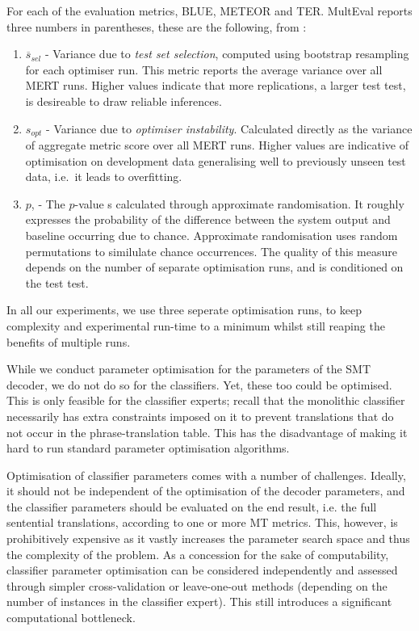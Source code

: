 For each of the evaluation metrics, BLUE, METEOR and TER. MultEval reports
three numbers in parentheses, these are the following, from \cite{MERTCONTROL}:

\begin{enumerate}
\item $\overline{s}_{sel}$ - Variance due to \emph{test set selection},
computed using bootstrap resampling for each optimiser run. This metric reports
the average variance over all MERT runs. Higher values indicate that more
replications, a larger test test, is desireable to draw reliable inferences.
\item $s_{opt}$ - Variance due to \emph{optimiser instability}. Calculated
directly as the variance of aggregate metric score over all MERT runs. Higher
values are indicative of optimisation on development data generalising well to
previously unseen test data, i.e.\ it leads to overfitting. 
\item $p$, - The $p$-value s calculated through approximate randomisation. It roughly
expresses the probability of the difference between the system output and
baseline occurring due to chance. Approximate randomisation uses random
permutations to similulate chance occurrences. The quality of this measure depends on the number of separate
optimisation runs, and is conditioned on the test test. 
\end{enumerate}

In all our experiments, we use three seperate optimisation runs, to keep
complexity and experimental run-time to a minimum whilst still reaping the
benefits of multiple runs.

While we conduct parameter optimisation for the parameters of the SMT
decoder, we do not do so for the classifiers. Yet, these too could
be optimised. This is only feasible for the classifier experts; recall
that the monolithic classifier necessarily has extra constraints
imposed on it to prevent translations that do not occur in the
phrase-translation table. This has the disadvantage of making it hard
to run standard parameter optimisation algorithms.

Optimisation of classifier parameters comes with a number of challenges.
Ideally, it should not be independent of the optimisation of the decoder
parameters, and the classifier parameters should be evaluated on the
end result, i.e. the full sentential translations, according to one or more MT
metrics. This, however, is prohibitively expensive as it vastly increases the
parameter search space and thus the complexity of the problem. As a concession
for the sake of computability, classifier parameter optimisation can be considered
independently and assessed through simpler cross-validation or leave-one-out
methods (depending on the number of instances in the classifier expert).  This
still introduces a significant computational bottleneck.  

